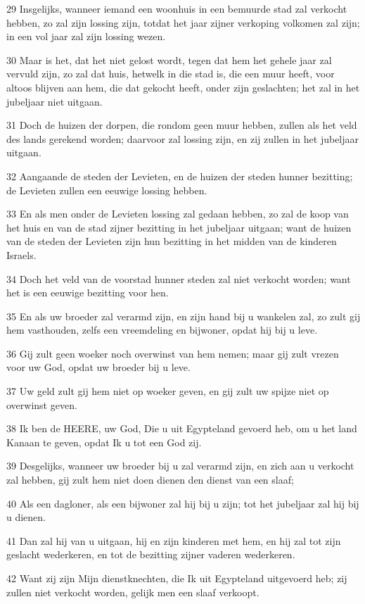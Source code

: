 \par 29 Insgelijks, wanneer iemand een woonhuis in een bemuurde stad zal verkocht hebben, zo zal zijn lossing zijn, totdat het jaar zijner verkoping volkomen zal zijn; in een vol jaar zal zijn lossing wezen.
\par 30 Maar is het, dat het niet gelost wordt, tegen dat hem het gehele jaar zal vervuld zijn, zo zal dat huis, hetwelk in die stad is, die een muur heeft, voor altoos blijven aan hem, die dat gekocht heeft, onder zijn geslachten; het zal in het jubeljaar niet uitgaan.
\par 31 Doch de huizen der dorpen, die rondom geen muur hebben, zullen als het veld des lands gerekend worden; daarvoor zal lossing zijn, en zij zullen in het jubeljaar uitgaan.
\par 32 Aangaande de steden der Levieten, en de huizen der steden hunner bezitting; de Levieten zullen een eeuwige lossing hebben.
\par 33 En als men onder de Levieten lossing zal gedaan hebben, zo zal de koop van het huis en van de stad zijner bezitting in het jubeljaar uitgaan; want de huizen van de steden der Levieten zijn hun bezitting in het midden van de kinderen Israels.
\par 34 Doch het veld van de voorstad hunner steden zal niet verkocht worden; want het is een eeuwige bezitting voor hen.
\par 35 En als uw broeder zal verarmd zijn, en zijn hand bij u wankelen zal, zo zult gij hem vasthouden, zelfs een vreemdeling en bijwoner, opdat hij bij u leve.
\par 36 Gij zult geen woeker noch overwinst van hem nemen; maar gij zult vrezen voor uw God, opdat uw broeder bij u leve.
\par 37 Uw geld zult gij hem niet op woeker geven, en gij zult uw spijze niet op overwinst geven.
\par 38 Ik ben de HEERE, uw God, Die u uit Egypteland gevoerd heb, om u het land Kanaan te geven, opdat Ik u tot een God zij.
\par 39 Desgelijks, wanneer uw broeder bij u zal verarmd zijn, en zich aan u verkocht zal hebben, gij zult hem niet doen dienen den dienst van een slaaf;
\par 40 Als een dagloner, als een bijwoner zal hij bij u zijn; tot het jubeljaar zal hij bij u dienen.
\par 41 Dan zal hij van u uitgaan, hij en zijn kinderen met hem, en hij zal tot zijn geslacht wederkeren, en tot de bezitting zijner vaderen wederkeren.
\par 42 Want zij zijn Mijn dienstknechten, die Ik uit Egypteland uitgevoerd heb; zij zullen niet verkocht worden, gelijk men een slaaf verkoopt.
